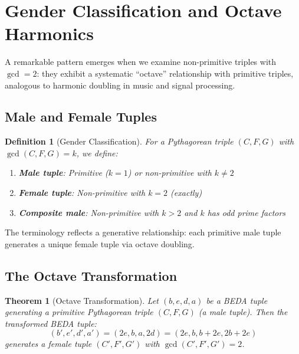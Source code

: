\documentclass[12pt]{article}
\newtheorem{theorem}{Theorem}
\newtheorem{definition}{Definition}
\begin{document}
\section{Gender Classification and Octave Harmonics}

A remarkable pattern emerges when we examine non-primitive triples with $\gcd = 2$: they exhibit a systematic ``octave'' relationship with primitive triples, analogous to harmonic doubling in music and signal processing.

\subsection{Male and Female Tuples}

\begin{definition}[Gender Classification]
For a Pythagorean triple $(C, F, G)$ with $\gcd(C, F, G) = k$, we define:

\begin{enumerate}
\item \textbf{Male tuple}: Primitive ($k = 1$) or non-primitive with $k \neq 2$
\item \textbf{Female tuple}: Non-primitive with $k = 2$ (exactly)
\item \textbf{Composite male}: Non-primitive with $k > 2$ and $k$ has odd prime factors
\end{enumerate}
\end{definition}

The terminology reflects a generative relationship: each primitive male tuple generates a unique female tuple via octave doubling.

\subsection{The Octave Transformation}

\begin{theorem}[Octave Transformation]\label{thm:octave}
Let $(b, e, d, a)$ be a BEDA tuple generating a primitive Pythagorean triple $(C, F, G)$ (a male tuple). Then the transformed BEDA tuple:
\begin{equation}
(b', e', d', a') = (2e, b, a, 2d) = (2e, b, b+2e, 2b+2e)
\end{equation}
generates a female tuple $(C', F', G')$ with $\gcd(C', F', G') = 2$.
\end{theorem}
\end{document}
